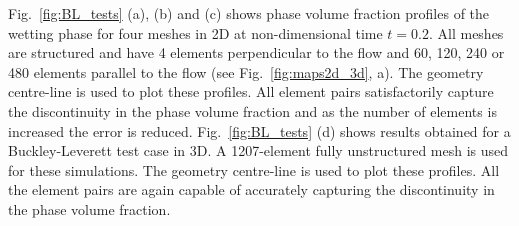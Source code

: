 \documentclass[times]{fldauth}
\begin{document}
Fig.~\ref{fig:BL_tests} (a), (b) and (c) shows phase volume fraction
profiles of the wetting phase for four meshes in 2D at
non-dimensional time $t=0.2$. All meshes are structured and have 4
elements perpendicular to the flow and 60, 120, 240 or 480 elements
parallel to the flow (see Fig.~\ref{fig:maps2d_3d}, a). The geometry
centre-line is used to plot these profiles. All element pairs
satisfactorily capture the discontinuity in the phase volume fraction
and as the number of elements is increased the error is reduced.
Fig.~\ref{fig:BL_tests} (d) shows results obtained for a
Buckley-Leverett test case in 3D. A 1207-element fully unstructured
mesh is used for these simulations. The geometry centre-line is used
to plot these profiles. All the element pairs are again capable of
accurately capturing the discontinuity in the phase volume fraction.
\end{document}
